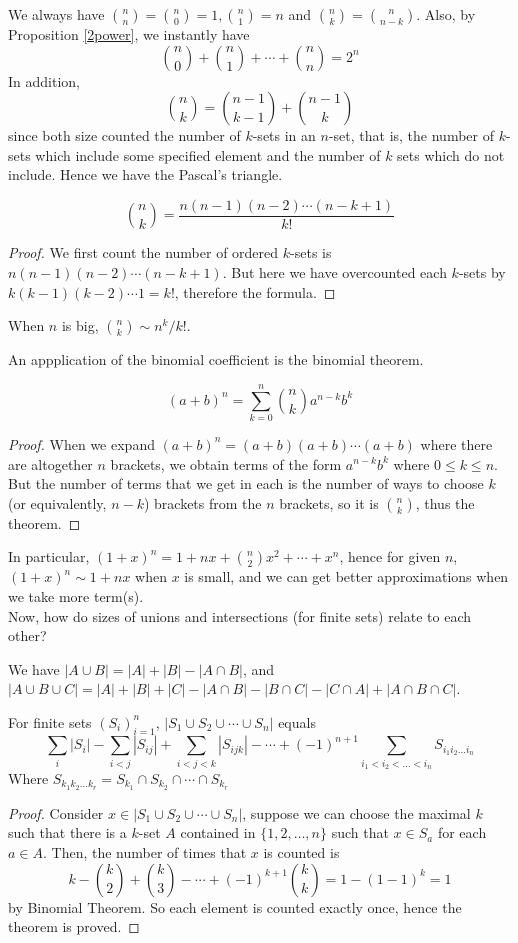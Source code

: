 We always have $\binom{n}{n}=\binom{n}{0}=1,\binom{n}{1}=n$ and $\binom{n}{k}=\binom{n}{n-k}$.
Also, by Proposition \ref{2power}, we instantly have
$$\binom{n}{0}+\binom{n}{1}+\cdots+\binom{n}{n}=2^n$$
In addition,
$$\binom{n}{k}=\binom{n-1}{k-1}+\binom{n-1}{k}$$
since both size counted the number of $k$-sets in an $n$-set, that is, the number of $k$-sets which include some specified element and the number of $k$ sets which do not include.
Hence we have the Pascal's triangle.
\begin{proposition}
    $$\binom{n}{k}=\frac{n(n-1)(n-2)\cdots (n-k+1)}{k!}$$
\end{proposition}
\begin{proof}
    We first count the number of ordered $k$-sets is $n(n-1)(n-2)\cdots (n-k+1)$.
    But here we have overcounted each $k$-sets by $k(k-1)(k-2)\cdots 1=k!$, therefore the formula.
\end{proof}
\begin{corollary}
    When $n$ is big, $\binom{n}{k}\sim n^k/k!$.
\end{corollary}
An appplication of the binomial coefficient is the binomial theorem.
\begin{theorem}
    $$(a+b)^n=\sum_{k=0}^n\binom{n}{k}a^{n-k}b^k$$
\end{theorem}
\begin{proof}
    When we expand $(a+b)^n=(a+b)(a+b)\cdots (a+b)$ where there are altogether $n$ brackets, we obtain terms of the form $a^{n-k}b^{k}$ where $0\le k\le n$.
    But the number of terms that we get in each is the number of ways to choose $k$ (or equivalently, $n-k$) brackets from the $n$ brackets, so it is $\binom{n}{k}$, thus the theorem.
\end{proof}
In particular, $(1+x)^n=1+nx+\binom{n}{2}x^2+\cdots +x^n$, hence for given $n$, $(1+x)^n\sim 1+nx$ when $x$ is small, and we can get better approximations when we take more term(s).\\
Now, how do sizes of unions and intersections (for finite sets) relate to each other?
\begin{example}
    We have $|A\cup B|=|A|+|B|-|A\cap B|$, and $|A\cup B\cup C|=|A|+|B|+|C|-|A\cap B|-|B\cap C|-|C\cap A|+|A\cap B\cap C|$.
\end{example}
\begin{theorem}
    For finite sets $(S_i)_{i=1}^n$, $|S_1\cup S_2\cup\cdots\cup S_n|$ equals
    $$\sum_i|S_i|-\sum_{i<j}|S_{ij}|+\sum_{i<j<k}|S_{ijk}|-\cdots+(-1)^{n+1}\sum_{i_1<i_2<\ldots <i_n}S_{i_1i_2\ldots i_n}$$
    Where $S_{k_1k_2\ldots k_r}=S_{k_1}\cap S_{k_2}\cap \cdots\cap S_{k_r}$
\end{theorem}
\begin{proof}
    Consider $x\in |S_1\cup S_2\cup\cdots\cup S_n|$, suppose we can choose the maximal $k$ such that there is a $k$-set $A$ contained in $\{1,2,\ldots, n\}$ such that $x\in S_a$ for each $a\in A$.
    Then, the number of times that $x$ is counted is
    $$k-\binom{k}{2}+\binom{k}{3}-\cdots+(-1)^{k+1}\binom{k}{k}=1-(1-1)^k=1$$
    by Binomial Theorem.
    So each element is counted exactly once, hence the theorem is proved.
\end{proof}
